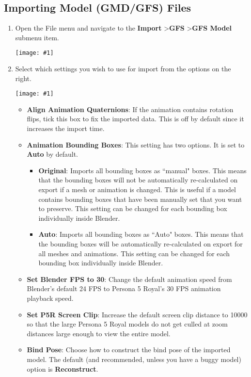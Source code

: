 \documentclass{article}
\newenvironment{guide}[1]
{
	\begin{center}
		\begin{tcolorbox}[%
			colback=black!20, 
			boxrule=0pt, 
			title=Step-by-step: #1,
			enhanced,
			breakable,
			overlay unbroken={%
                \draw[line width=1pt, black, rounded corners]
        	    (frame.north west) rectangle (frame.south east);
			},
    		overlay first={%
        		 \draw[line width=1pt, black, rounded corners]
        	    (frame.south west) -- (frame.north west) -- (frame.north east) -- (frame.south east);
                \draw[line width=1pt, black]
                (frame.south west) -- (frame.south east);
            },
    		overlay middle={%
                \draw[line width=1pt, black]
        	    (frame.north west) rectangle (frame.south east);
        	},
    		overlay last={%
                \draw[line width=1pt, black, rounded corners]
        	    (frame.north west) -- (frame.south west) -- (frame.south east) -- (frame.north east);
                \draw[line width=1pt, black]
                (frame.north west) -- (frame.north east);
           	}
        ]{}
    	\begin{enumerate}
}
{
    		\end{enumerate}
    	\end{tcolorbox}
	\end{center}  	 
}
\newcommand{\guideimage}[1]
{
	\begin{center}
		\texttt{[image: \#1]}
	\end{center}
}
\begin{document}
\subsection{Importing Model (GMD/GFS) Files}
\begin{guide}{Accessing the Model Import Menu}
\item Open the File menu and navigate to the \textbf{Import} \textgreater\space \textbf{GFS} \textgreater\space \textbf{GFS Model} submenu item.
\guideimage{images/import/import_gmd.png}
\item Select which settings you wish to use for import from the options on the right.
\guideimage{images/import/import_gmd_properties.png}
\begin{itemize}
\item \textbf{Align Animation Quaternions}: If the animation contains rotation flips, tick this box to fix the imported data. This is off by default since it increases the import time.
\item \textbf{Animation Bounding Boxes}: This setting has two options. It is set to \textbf{Auto} by default.
\begin{itemize}
\item \textbf{Original}: Imports all bounding boxes as ``manual" boxes. This means that the bounding boxes will not be automatically re-calculated on export if a mesh or animation is changed. This is useful if a model contains bounding boxes that have been manually set that you want to preserve. This setting can be changed for each bounding box individually inside Blender.
\item \textbf{Auto}: Imports all bounding boxes as ``Auto" boxes. This means that the bounding boxes will be automatically re-calculated on export for all meshes and animations. This setting can be changed for each bounding box individually inside Blender.
\end{itemize}
\item \textbf{Set Blender FPS to 30}: Change the default animation speed from Blender's default 24 FPS to Persona 5 Royal's 30 FPS animation playback speed.
\item \textbf{Set P5R Screen Clip}: Increase the default screen clip distance to 10000 so that the large Persona 5 Royal models do not get culled at zoom distances large enough to view the entire model.
\item \textbf{Bind Pose}: Choose how to construct the bind pose of the imported model. The default (and recommended, unless you have a buggy model) option is \textbf{Reconstruct}.

\end{itemize}
\end{guide}
\end{document}
